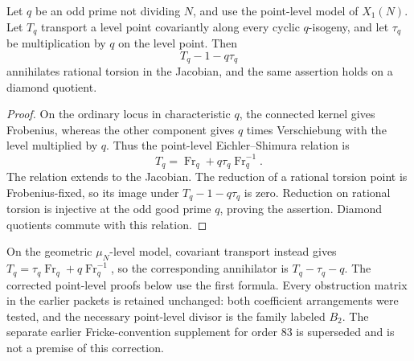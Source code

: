 \begin{lemma}\label{lem:nonic-point-hecke-annihilator}
Let $q$ be an odd prime not dividing $N$, and use the point-level model of $X_1(N)$. Let $T_q$ transport a level point covariantly along every cyclic $q$-isogeny, and let $\tau_q$ be multiplication by $q$ on the level point. Then
\[
 T_q-1-q\tau_q
\]
annihilates rational torsion in the Jacobian, and the same assertion holds on a diamond quotient.
\end{lemma}
\begin{proof}
On the ordinary locus in characteristic $q$, the connected kernel gives Frobenius, whereas the other component gives $q$ times Verschiebung with the level multiplied by $q$. Thus the point-level Eichler--Shimura relation is
\[
 T_q=\operatorname{Fr}_q+q\tau_q\operatorname{Fr}_q^{-1}.
\]
The relation extends to the Jacobian. The reduction of a rational torsion point is Frobenius-fixed, so its image under $T_q-1-q\tau_q$ is zero. Reduction on rational torsion is injective at the odd good prime $q$, proving the assertion. Diamond quotients commute with this relation.
\end{proof}
\begin{remark}
On the geometric $\mu_N$-level model, covariant transport instead gives $T_q=\tau_q\operatorname{Fr}_q+q\operatorname{Fr}_q^{-1}$, so the corresponding annihilator is $T_q-\tau_q-q$. The corrected point-level proofs below use the first formula. Every obstruction matrix in the earlier packets is retained unchanged: both coefficient arrangements were tested, and the necessary point-level divisor is the family labeled $B_2$. The separate earlier Fricke-convention supplement for order $83$ is superseded and is not a premise of this correction.
\end{remark}
